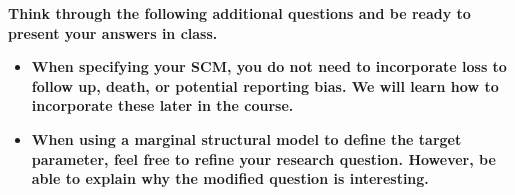 \documentclass{article}
\begin{document}
\textbf{Think through the following additional questions and be ready to present your answers in class.}

\begin{itemize}

  \item \textbf{When specifying your SCM, you do not need to incorporate loss to follow up, death, or potential reporting bias. We will learn how to incorporate these later in the course.}

  \item \textbf{When using a marginal structural model to define the target parameter, feel free to refine your research question. However, be able to explain why the modified question is interesting.}
  
\end{itemize}
\end{document}
